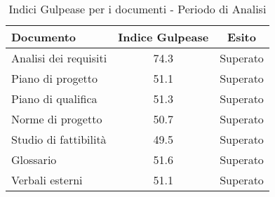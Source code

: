       
      \begin{table}[H]
        \centering
        \begin{tabular}{|l|c|c|}
          \hline
          \textbf{Documento} &\textbf{Indice Gulpease} &\textbf{Esito}\\
          \hline
          Analisi dei requisiti &74.3  &Superato \\
          Piano di progetto &51.1  &Superato \\
          Piano di qualifica  &51.3  &Superato \\
          Norme di progetto &50.7  &Superato \\
          Studio di fattibilità &49.5  &Superato \\
          Glossario &51.6  &Superato  \\
          Verbali esterni &51.1  &Superato \\
          \hline
        \end{tabular}
        \caption{Indici Gulpease per i documenti - Periodo di Analisi}
      \end{table}

